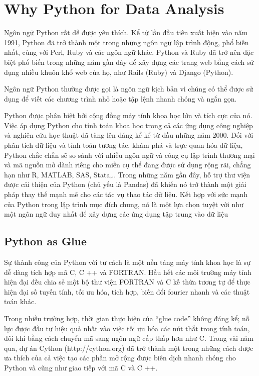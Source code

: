 \section{Why Python for Data Analysis}
\quad Ngôn ngữ Python rất dễ được yêu thích. Kể từ lần đầu tiên xuất hiện vào năm 1991, Python đã trở thành một trong những ngôn ngữ lập trình động, phổ biến nhất, cùng với Perl, Ruby và các ngôn ngữ khác. Python và Ruby đã trở nên đặc biệt phổ biến trong những năm gần đây để xây dựng các trang web bằng cách sử dụng nhiều khuôn khổ web của họ, như Rails (Ruby) và Django (Python).\par
Ngôn ngữ Python thường được gọi là ngôn ngữ kịch bản vì chúng có thể được sử dụng để viết các chương trình nhỏ hoặc tập lệnh nhanh chóng và ngắn gọn.\par
Python được phân biệt bởi cộng đồng máy tính khoa học lớn và tích cực của nó. Việc áp dụng Python cho tính toán khoa học trong cả các ứng dụng công nghiệp và nghiên cứu học thuật đã tăng lên đáng kể kể từ đầu những năm 2000. Đối với phân tích dữ liệu và tính toán tương tác, khám phá và trực quan hóa dữ liệu, Python chắc chắn sẽ so sánh với nhiều ngôn ngữ và công cụ lập trình thương mại và mã nguồn mở dành riêng cho miền cụ thể đang được sử dụng rộng rãi, chẳng hạn như R, MATLAB, SAS, Stata,..
Trong những năm gần đây, hỗ trợ thư viện được cải thiện của Python (chủ yếu là Pandas) đã khiến nó trở thành một giải pháp thay thế mạnh mẽ cho các tác vụ thao tác dữ liệu. Kết hợp với sức mạnh của Python trong lập trình mục đích chung, nó là một lựa chọn tuyệt vời như một ngôn ngữ duy nhất để xây dựng các ứng dụng tập trung vào dữ liệu
\subsection{Python as Glue}
\quad Sự thành công của Python với tư cách là một nền tảng máy tính khoa học là sự dễ dàng tích hợp mã C, C ++ và FORTRAN. Hầu hết các môi trường máy tính hiện đại đều chia sẻ một bộ thư viện FORTRAN và C kế thừa tương tự để thực hiện đại số tuyến tính, tối ưu hóa, tích hợp, biến đổi fourier nhanh và các thuật toán khác.\par
Trong nhiều trường hợp, thời gian thực hiện của “glue code” không đáng kể; nỗ lực được đầu tư hiệu quả nhất vào việc tối ưu hóa các nút thắt trong tính toán, đôi khi bằng cách chuyển mã sang ngôn ngữ cấp thấp hơn như C. Trong vài năm qua, dự án Cython (http://cython.org) đã trở thành một trong những cách được ưa thích của cả việc tạo các phần mở rộng được biên dịch nhanh chóng cho Python và cũng như giao tiếp với mã C và C ++.\par

